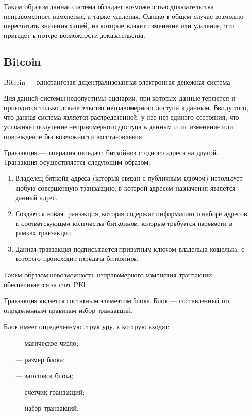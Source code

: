 Таким образом данная система обладает возможностью доказательства неправомерного изменения, а также удаления. Однако в общем случае возможно пересчитать значения хэшей, на которые влияет изменение или удаление, что приведет к потере возможности доказательства.

\clearpage

\subsection{Bitcoin}

Bitcoin \cite{bitcoin} --- одноранговая децентрализованная электронная денежная система.

Для данной системы недопустимы сценарии, при которых данные теряются и приводится только доказательство неправомерного доступа к данным. Ввиду того, что данная система является распределенной, у нее нет единого состояния, что усложняет получение неправомерного доступа к данным и их изменение или повреждение без возможности восстановления.

Транзакция --- операция передачи биткойнов с одного адреса на другой. Транзакция осуществляется следующим образом:

\begin{enumerate}
    \item Владелец биткойн-адреса (который связан с публичным ключом) использует любую совершенную транзакцию, в которой адресом назначения является данный адрес.
    \item Создается новая транзакция, которая содержит информацию о наборе адресов и соответсвующем количестве биткоинов, которые требуется перевести в рамках транзакции.
    \item Данная транзакция подписывается приватным ключом владельца кошелька, с которого происходит передача биткоинов.
\end{enumerate}

Таким образом невозможность неправомерного изменения транзакции обеспечивается за счет PKI \cite{pki}.

Транзакция является составным элементом блока. Блок --- составленный по определенным правилам набор транзакций.

Блок имеет определенную структуру, в которую входят:
\begin{itemize}
    \item[---] магическое число;
    \item[---] размер блока;
    \item[---] заголовок блока;
    \item[---] счетчик транзакций;
    \item[---] набор транзакций.
\end{itemize}

